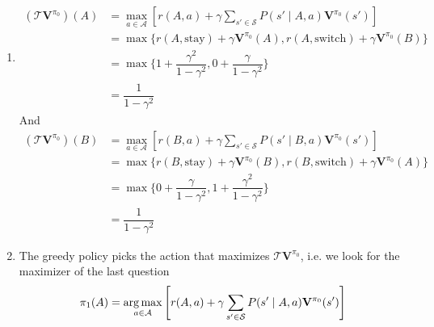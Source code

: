 \begin{Solution}
\begin{enumerate} [label=\alph*)]
$$\begin{aligned}
        & = \sum_{t=0}^\infty \gamma^t \\
        & = \dfrac{1}{1 - \gamma}
        \end{aligned}
        $$
        And
        $$
        \begin{aligned}
        \textbf{V}^*(B) & = \mathbb{E} \left [ \sum_{t=0}^\infty \gamma^t r(s_t, a_t) \mid s_0=B, \pi^* \right ] \\
        & = r(B, \text{switch}) + \sum_{t=1}^\infty \gamma^t r(A, \text{stay}) \\
        & = \sum_{t=0}^\infty \gamma^t \\
        & = \dfrac{1}{1 - \gamma}
        \end{aligned}
        $$
        \item
        $$
        \begin{aligned}
        (\mathcal{T}\mathbf{V}^{\pi_0})(A) & = \max_{a \in \mathcal{A}} \left [ r(A, a) + \gamma \sum_{s' \in \mathcal{S}} P(s' \mid A, a) \mathbf{V}^{\pi_0}(s') \right ] \\
        & = \max \{r(A, \text{stay}) + \gamma \mathbf{V}^{\pi_0}(A), r(A, \text{switch}) + \gamma \mathbf{V}^{\pi_0}(B)\} \\
        & = \max \{1 + \dfrac{\gamma^2}{1 - \gamma^2}, 0 + \dfrac{\gamma}{1 - \gamma^2}\} \\
        & = \dfrac{1}{1 - \gamma^2}
        \end{aligned}
        $$
        And
        $$
        \begin{aligned}
        (\mathcal{T}\mathbf{V}^{\pi_0})(B) & = \max_{a \in \mathcal{A}} \left [ r(B, a) + \gamma \sum_{s' \in \mathcal{S}} P(s' \mid B, a) \mathbf{V}^{\pi_0}(s') \right ] \\
        & = \max \{r(B, \text{stay}) + \gamma \mathbf{V}^{\pi_0}(B), r(B, \text{switch}) + \gamma \mathbf{V}^{\pi_0}(A)\} \\
        & = \max \{0 + \dfrac{\gamma}{1 - \gamma^2}, 1 + \dfrac{\gamma^2}{1 - \gamma^2}\} \\
        & = \dfrac{1}{1 - \gamma^2}
        \end{aligned}
        $$
        \item
        The greedy policy picks the action that maximizes $\mathcal{T}\mathbf{V}^{\pi_0}$, i.e. we look for the maximizer of the last question
        $$
        \begin{aligned}
        \pi_1(A) & = \argmax_{a \in \mathcal{A}} \left [ r(A, a) + \gamma \sum_{s' \in \mathcal{S}} P(s' \mid A, a) \mathbf{V}^{\pi_0}(s') \right ] \\

\end{aligned}$$
\end{enumerate}
\end{Solution}
